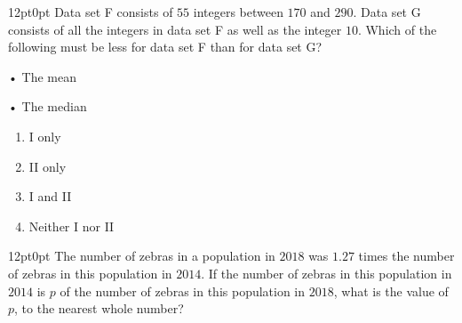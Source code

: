 \documentclass[11pt, twocolumn]{article}
\newcounter{questionnum}
\begin{document}
\vspace{6pt}\noindent
\begin{minipage}{\columnwidth}\raggedright
\noindent{}\par\vspace{8pt}
\begin{adjustwidth}{12pt}{0pt}
Data set F consists of $55$ integers between $170$ and $290$. Data set G consists of all the integers in data set F as well as the integer $10$. Which of the following must be less for data set F than for data set G?

• The mean

• The median
\begin{enumerate}[label=\Alph*),leftmargin=18pt,topsep=3pt,itemsep=2pt]
  \item I only
  \item II only
  \item I and II
  \item Neither I nor II
\end{enumerate}
\end{adjustwidth}
\end{minipage}\par

\vspace{6pt}\noindent
\begin{minipage}{\columnwidth}\raggedright
\noindent{}\par\vspace{8pt}
\begin{adjustwidth}{12pt}{0pt}
The number of zebras in a population in $2018$ was $1.27$ times the number of zebras in this population in $2014$. If the number of zebras in this population in $2014$ is $p$ of the number of zebras in this population in $2018$, what is the value of $p$, to the nearest whole number?
\end{adjustwidth}
\end{minipage}\par
\end{document}

